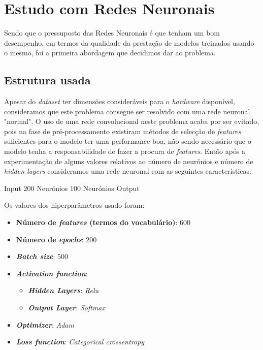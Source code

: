 \section{Estudo com Redes Neuronais}
Sendo que o pressuposto das Redes Neuronais é que tenham um bom desempenho, em termos da qualidade da prestação de modelos treinados usando o mesmo, foi a primeira abordagem que decidimos dar ao problema.

\subsection{Estrutura usada}
Apesar do \textit{dataset} ter dimensões consideráveis para o \textit{hardware} disponível, consideramos que este problema consegue ser resolvido com uma rede neuronal "normal". O uso de uma rede convolucional neste problema acaba por ser evitado, pois na fase de pré-processamento existiram métodos de selecção de \textit{features} suficientes para o modelo ter uma performance boa, não sendo necessário que o modelo tenha a responsabilidade de fazer a procura de \textit{features}.
Então após a experimentação de alguns valores relativos ao número de neurónios e número de \textit{hidden layers} consideramos uma rede neuronal com as seguintes características:

Input \textrightarrow{} 200 Neurónios \textrightarrow{} 100 Neurónios \textrightarrow{} Output

Os valores dos hiperparâmetros usado foram:
\begin{itemize}
    \item \textbf{Número de \textit{features} (termos do vocabulário)}: 600
    \item \textbf{Número de \textit{epochs}}: 200
    \item \textbf{\textit{Batch size}}: 500
    \item \textbf{\textit{Activation function}}:
        \begin{itemize}
            \item \textbf{\textit{Hidden Layers}}: \textit{Relu} \cite{relu_function}
            \item \textbf{\textit{Output Layer}}: \textit{Softmax} \cite{softmax_function}
        \end{itemize}
    \item \textbf{\textit{Optimizer}}: \textit{Adam} \cite{adam_optimizer}
    \item \textbf{\textit{Loss function}}: \textit{Categorical crossentropy} \cite{categorical_crossentropy_optimizer}
\end{itemize}



